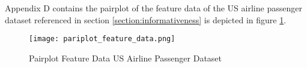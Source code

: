   
  Appendix D contains the pairplot of the feature data of the US airline 
  passenger dataset referenced in section \ref{section:informativeness} is 
  depicted in figure \ref{fig:pairplot_feature}.

  \begin{figure}[h]
		\centering
		\texttt{[image: pariplot\_feature\_data.png]}
		\caption{Pairplot Feature Data US Airline Passenger Dataset}
        \label{fig:pairplot_feature}
  \end{figure}

